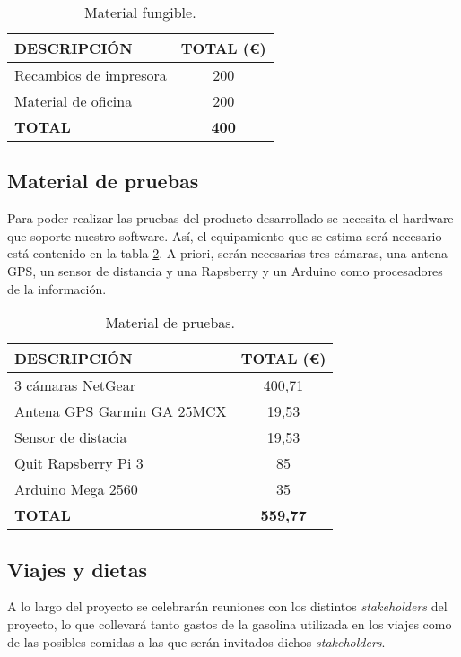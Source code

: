 \begin{table}[H]
\begin{center}
\begin{tabular}{l c}
\textbf{DESCRIPCIÓN} & \textbf{TOTAL (\euro)}\\ \hline \hline
Recambios de impresora & 200\\
Material de oficina & 200\\ \hline \hline
\textbf{TOTAL} & \textbf{400}\\ \hline
\end{tabular}
\caption{Material fungible.}
\label{tab:fungible}
\end{center}
\end{table}


\subsection{Material de pruebas}
\par Para poder realizar las pruebas del producto desarrollado se necesita el hardware que soporte nuestro software. Así, el equipamiento que se estima será necesario está contenido en la tabla \ref{tab:pruebas}. A priori, serán necesarias tres cámaras, una antena GPS, un sensor de distancia y una Rapsberry y un Arduino como procesadores de la información.

\begin{table}[H]
\begin{center}
\begin{tabular}{l c}
\textbf{DESCRIPCIÓN} & \textbf{TOTAL (\euro)}\\ \hline \hline
3 cámaras NetGear & 400,71\\
Antena GPS Garmin GA 25MCX & 19,53\\
Sensor de distacia & 19,53\\
Quit Rapsberry Pi 3 & 85\\
Arduino Mega 2560 & 35\\ \hline \hline
\textbf{TOTAL} & \textbf{559,77}\\ \hline
\end{tabular}
\caption{Material de pruebas.}
\label{tab:pruebas}
\end{center}
\end{table}




\subsection{Viajes y dietas}
\par A lo largo del proyecto se celebrarán reuniones con los distintos \textit{stakeholders} del proyecto, lo que collevará tanto gastos de la gasolina utilizada en los viajes como de las posibles comidas a las que serán invitados dichos \textit{stakeholders}.


